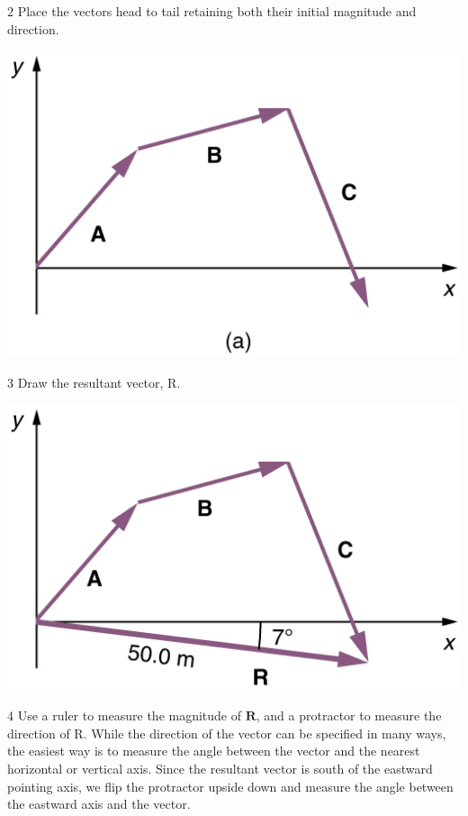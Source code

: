 \documentclass[
]{book}
\begin{document}
\(2\) Place the vectors head to tail retaining both their initial
magnitude and direction.

\includegraphics{images/Figure_03_02_09.jpg}

\(3\) Draw the resultant vector, \(\text{R}{}\).

\includegraphics{images/Figure_03_02_10.jpg}

\(4\) Use a ruler to measure the magnitude of \(\textbf{R}{}\), and a
protractor to measure the direction of \(\text{R}{}\). While the direction
of the vector can be specified in many ways, the easiest way is to
measure the angle between the vector and the nearest horizontal or
vertical axis. Since the resultant vector is south of the eastward
pointing axis, we flip the protractor upside down and measure the angle
between the eastward axis and the vector.
\end{document}
